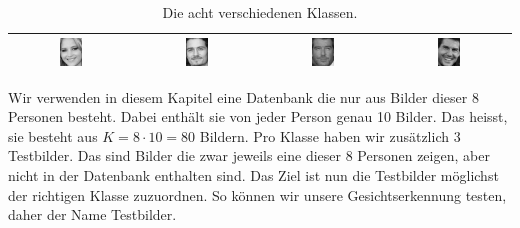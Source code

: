 \begin{table}[ht]
\begin{tabular}{|c|c|c|c|}
		\includegraphics[width=0.2\textwidth]{images/recognition/Jennifer_Lawrence} & \includegraphics[width=0.2\textwidth]{images/recognition/Orlando_Bloom} & \includegraphics[width=0.2\textwidth]{images/recognition/Pierce_Brosnan} & \includegraphics[width=0.2\textwidth]{images/recognition/Tom_Cruise} \\ \hline
	\end{tabular}
	\caption{Die acht verschiedenen Klassen. }
	\label{tab:classes}
\end{table}
Wir verwenden in diesem Kapitel eine Datenbank die nur aus Bilder dieser 8 Personen besteht.
Dabei enthält sie von jeder Person genau 10 Bilder.
Das heisst, sie besteht aus $K=8\cdot 10=80$ Bildern.
Pro Klasse haben wir zusätzlich 3 Testbilder.
Das sind Bilder die zwar jeweils eine dieser 8 Personen zeigen, aber nicht in der Datenbank enthalten sind.
Das Ziel ist nun die Testbilder möglichst der richtigen Klasse zuzuordnen.
So können wir unsere Gesichtserkennung testen, daher der Name \glqq{}Testbilder\grqq{}.
